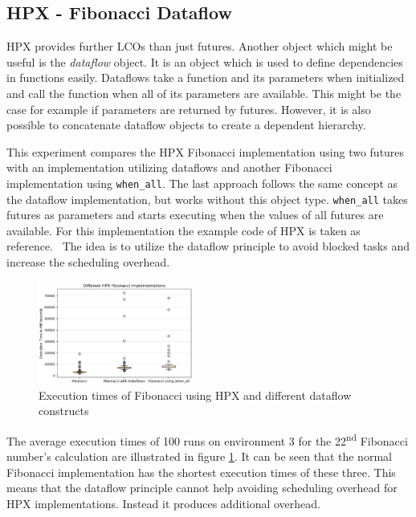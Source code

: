   
\subsection{HPX - Fibonacci Dataflow}
HPX provides further LCOs than just futures.
Another object which might be useful is the \textit{dataflow} object.
It is an object which is used to define dependencies in functions easily.
Dataflows take a function and its parameters when initialized and call the function when all of its parameters are available. 
This might be the case for example if parameters are returned by futures.
However, it is also possible to concatenate dataflow objects to create a dependent hierarchy.~\cite{TheSTEARGroup.2020}

This experiment compares the HPX Fibonacci implementation using two futures with an implementation utilizing dataflows and another Fibonacci implementation using \texttt{when\_all}.
The last approach follows the same concept as the dataflow implementation, but works without this object type.
\texttt{when\_all} takes futures as parameters and starts executing when the values of all futures are available.
For this implementation the example code of HPX is taken as reference.~\cite{HPXGitHub.2020}
The idea is to utilize the dataflow principle to avoid blocked tasks and increase the scheduling overhead.

\begin{figure}[h]
	\centering
	\includegraphics[width=0.45\textwidth]{figures/fibDataflow.JPG}
	\caption{Execution times of Fibonacci using HPX and different dataflow constructs}
	\label{fig:fib_dataflow}
\end{figure}

The average execution times of 100 runs on environment 3 for the 22\textsuperscript{nd} Fibonacci number's calculation are illustrated in figure \ref{fig:fib_dataflow}.
It can be seen that the normal Fibonacci implementation has the shortest execution times of these three.
This means that the dataflow principle cannot help avoiding scheduling overhead for HPX implementations.
Instead it produces additional overhead.


